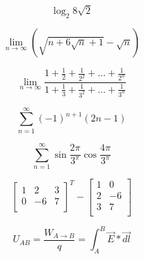 \documentclass[a4paper]{article}
\begin{document}
\begin{center}
$$
\log_{2} 8\sqrt{2}
$$

$$
\lim_{n \to \infty} \left( \sqrt{n+6\sqrt{n}+1} -\sqrt{n} \right)
$$



$$
\lim_{n \to \infty} \frac{1+ \frac{1}{2} + \frac{1}{2^{2}} + \ldots + \frac{1}{2^{n}}}{1 + \frac{1}{3} + \frac{1}{3^{2}} + \ldots + \frac{1}{3^{n}}}
$$



$$
\sum_{n=1}^{\infty} (-1)^{n+1}(2n-1)
$$


$$
\sum_{n=1}^{\infty} \sin \frac{2\pi}{3^{\pi}} \cos \frac{4\pi}{3^{\pi}}
$$

$$
\left[
\begin{array}{lll}
1 & 2 & 3 \\ 
0 & -6 & 7 \\
\end{array}
\right]^{T}
-
\left[
\begin{array}{ll}
1 & 0\\ 
2 & -6  \\
3 & 7  \\
\end{array}
\right]
$$

$$
U_{AB}=\frac{W_{A \rightarrow B}}{q}= \int_{A}^{B}\vec{E}*\vec{dl}
$$




\end{center}
\end{document}
